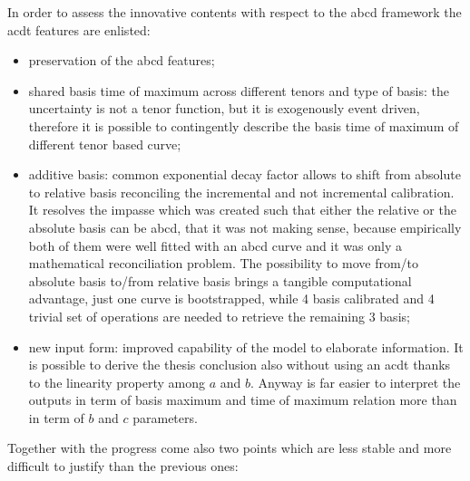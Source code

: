 In order to assess the innovative contents with respect to the abcd framework the acdt features are enlisted:

\begin{itemize}
    \item preservation of the abcd features;
    \item shared basis time of maximum across different tenors and type of basis: the uncertainty is not a tenor function, but  it is exogenously event driven, therefore it is possible to contingently describe the basis time of maximum of different tenor based curve;
    \item additive basis: common exponential decay factor allows to shift from absolute to relative basis reconciling the incremental and not incremental calibration. It resolves the impasse which was created such that either the relative or the absolute basis can be abcd, that it was not making sense, because empirically both of them were well fitted with an abcd curve and it was only a mathematical reconciliation problem. The possibility to move from/to absolute basis to/from relative basis brings a tangible computational advantage, just one curve is bootstrapped, while 4 basis calibrated and 4 trivial set of operations are needed to retrieve the remaining 3 basis;
    \item new input form: improved capability of the model to elaborate information. It is possible to derive the thesis conclusion also without using an acdt thanks to the linearity property among $a$ and $b$. Anyway is far easier to interpret the outputs in term of basis maximum and time of maximum relation more than in term of $b$ and $c$ parameters.
\end{itemize} 

Together with the progress come also two points which are less stable and more difficult to justify than the previous ones:

